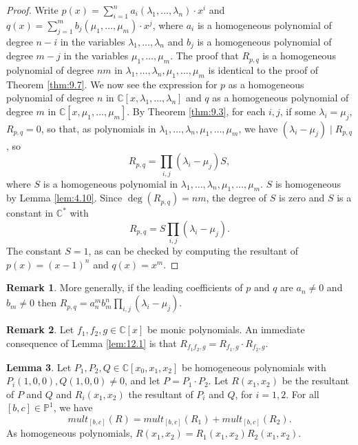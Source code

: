 \documentclass{article}
\newcommand{\C}{\mathbb{C}}
\renewcommand{\P}{\mathbb{P}}
\newcommand{\rb}[1]{\left( #1 \right)}
\renewcommand{\sb}[1]{\left[ #1 \right]}
\theoremstyle{definition}\newtheorem{definition}{Definition}[section]
\theoremstyle{definition}\newtheorem{notation}[definition]{Notation}
\theoremstyle{definition}\newtheorem{remark}[definition]{Remark}
\theoremstyle{definition}\newtheorem{example}[definition]{Example}
\theoremstyle{definition}\newtheorem{fact}{Fact}
\theoremstyle{definition}\newtheorem{exercise}{Exercise}
\newtheorem{lemma}[definition]{Lemma}
\begin{document}
\begin{proof}
Write $ p\rb{x} = \sum_{i = 1}^n a_i\rb{\lambda_1, \dots, \lambda_n} \cdot x^i $ and $ q\rb{x} = \sum_{j = 1}^m b_j\rb{\mu_1, \dots, \mu_m} \cdot x^j $, where $ a_i $ is a homogeneous polynomial of degree $ n - i $ in the variables $ \lambda_1, \dots, \lambda_n $ and $ b_j $ is a homogeneous polynomial of degree $ m - j $ in the variables $ \mu_1, \dots, \mu_m $. The proof that $ R_{p, q} $ is a homogeneous polynomial of degree $ nm $ in $ \lambda_1, \dots, \lambda_n, \mu_1, \dots, \mu_m $ is identical to the proof of Theorem \ref{thm:9.7}. We now see the expression for $ p $ as a homogeneous polynomial of degree $ n $ in $ \C\sb{x, \lambda_1, \dots, \lambda_n} $ and $ q $ as a homogeneous polynomial of degree $ m $ in $ \C\sb{x, \mu_1, \dots, \mu_m} $. By Theorem \ref{thm:9.3}, for each $ i, j $, if some $ \lambda_i = \mu_j $, $ R_{p, q} = 0 $, so that, as polynomials in $ \lambda_1, \dots, \lambda_n, \mu_1, \dots, \mu_m $, we have $ \rb{\lambda_i - \mu_j} \mid R_{p, q} $, so
$$ R_{p, q} = \prod_{i, j} \rb{\lambda_i - \mu_j}S, $$
where $ S $ is a homogeneous polynomial in $ \lambda_1, \dots, \lambda_n, \mu_1, \dots, \mu_m $. $ S $ is homogeneous by Lemma \ref{lem:4.10}. Since $ \deg\rb{R_{p, q}} = nm $, the degree of $ S $ is zero and $ S $ is a constant in $ \C^* $ with
$$ R_{p, q} = S\prod_{i, j} \rb{\lambda_i - \mu_j}. $$
The constant $ S = 1 $, as can be checked by computing the resultant of $ p\rb{x} = \rb{x - 1}^n $ and $ q\rb{x} = x^m $.
\end{proof}

\begin{remark}
More generally, if the leading coefficients of $ p $ and $ q $ are $ a_n \ne 0 $ and $ b_m \ne 0 $ then $ R_{p, q} = a_n^mb_m^n\prod_{i, j} \rb{\lambda_i - \mu_j} $.
\end{remark}

\begin{remark}
\label{rem:12.3}
Let $ f_1, f_2, g \in \C\sb{x} $ be monic polynomials. An immediate consequence of Lemma \ref{lem:12.1} is that $ R_{f_1f_2, g} = R_{f_1, g} \cdot R_{f_2, g} $.
\end{remark}

\begin{lemma}
\label{lem:12.4}
Let $ P_1, P_2, Q \in \C\sb{x_0, x_1, x_2} $ be homogeneous polynomials with $ P_i\rb{1, 0, 0}, Q\rb{1, 0, 0} \ne 0 $, and let $ P = P_1 \cdot P_2 $. Let $ R\rb{x_1, x_2} $ be the resultant of $ P $ and $ Q $ and $ R_i\rb{x_1, x_2} $ the resultant of $ P_i $ and $ Q $, for $ i = 1, 2 $. For all $ \sb{b, c} \in \P^1 $, we have
$$ mult_{\sb{b, c}}\rb{R} = mult_{\sb{b, c}}\rb{R_1} + mult_{\sb{b, c}}\rb{R_2}. $$
As homogeneous polynomials, $ R\rb{x_1, x_2} = R_1\rb{x_1, x_2}R_2\rb{x_1, x_2} $.
\end{lemma}
\end{document}
